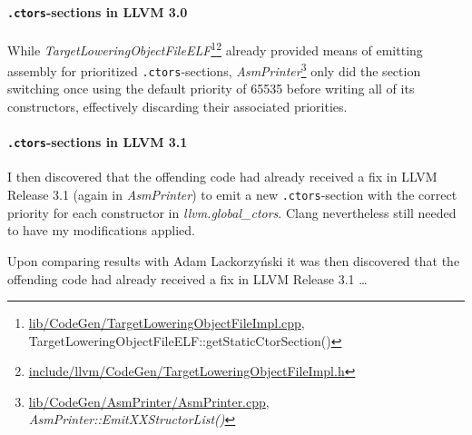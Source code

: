 \paragraph{\texttt{.ctors}-sections in LLVM 3.0}

While
\emph{Target\-Lowering\-Object\-File\-ELF}\footnote{\url{lib/CodeGen/TargetLoweringObjectFileImpl.cpp},
TargetLoweringObjectFileELF::getStaticCtorSection()}\footnote{\url{include/llvm/CodeGen/TargetLoweringObjectFileImpl.h}}
already provided means of emitting assembly for prioritized
\texttt{.ctors}-sections,
\emph{Asm\-Printer}\footnote{\url{lib/CodeGen/AsmPrinter/AsmPrinter.cpp},
\emph{AsmPrinter::EmitXXStructorList()}} only did the section switching once
using the default priority of 65535 before writing all of its constructors,
effectively discarding their associated priorities.



\paragraph{\texttt{.ctors}-sections in LLVM 3.1}

I then discovered that the
offending code had already received
a fix in LLVM
Release 3.1 (again in \emph{AsmPrinter}) to emit a new \texttt{.ctors}-section
with the correct priority for each constructor
in \emph{llvm.global\_ctors}. Clang nevertheless still needed to have my
modifications applied.

\begin{leftbar}
  Upon comparing results with Adam Lackorzyński it was then discovered that the
  offending code had already received a fix in LLVM Release 3.1 …
\end{leftbar}


